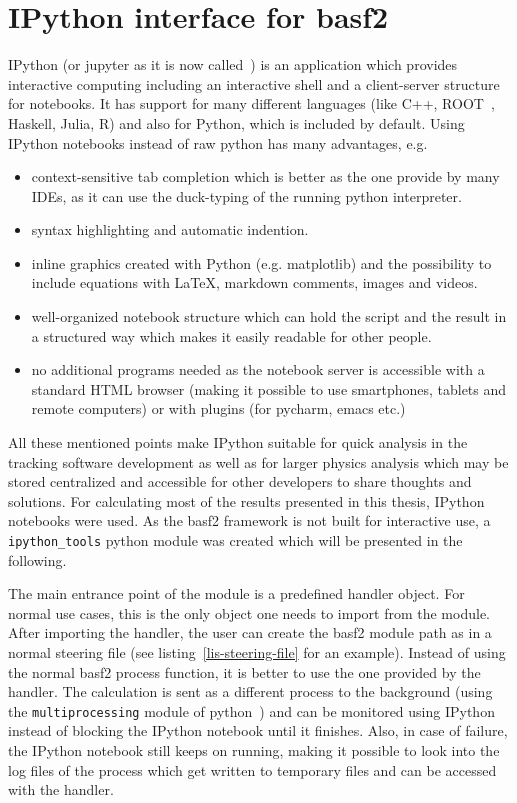 \section{IPython interface for basf2}

IPython (or jupyter as it is now called~\cite{jupyter}) is an application which provides interactive computing including an interactive shell and a client-server structure for notebooks. It has support for many different languages (like C++, ROOT~\cite{root_ipython}, Haskell, Julia, R) and also for Python, which is included by default. Using IPython notebooks instead of raw python has many advantages, e.g.
\begin{itemize}
  \item context-sensitive tab completion which is better as the one provide by many IDEs, as it can use the duck-typing of the running python interpreter.
  \item syntax highlighting and automatic indention.
  \item inline graphics created with Python (e.g. matplotlib) and the possibility to include equations with \LaTeX, markdown comments, images and videos.
  \item well-organized notebook structure which can hold the script and the result in a structured way which makes it easily readable for other people.
  \item no additional programs needed as the notebook server is accessible with a standard HTML browser (making it possible to use smartphones, tablets and remote computers) or with plugins (for pycharm, emacs etc.)
\end{itemize}

All these mentioned points make IPython suitable for quick analysis in the tracking software development as well as for larger physics analysis which may be stored centralized and accessible for other developers to share thoughts and solutions. For calculating most of the results presented in this thesis, IPython notebooks were used. As the basf2 framework is not built for interactive use, a \texttt{ipython\_tools} python module was created which will be presented in the following.

The main entrance point of the module is a predefined handler object. For normal use cases, this is the only object one needs to import from the module. After importing the handler, the user can create the basf2 module path as in a normal steering file (see listing~\ref{lis-steering-file} for an example). Instead of using the normal basf2 process function, it is better to use the one provided by the handler. The calculation is sent as a different process to the background (using the \texttt{multiprocessing} module of python~\cite{multiprocessing}) and can be monitored using IPython instead of blocking the IPython notebook until it finishes. Also, in case of failure, the IPython notebook still keeps on running, making it possible to look into the log files of the process which get written to temporary files and can be accessed with the handler.

